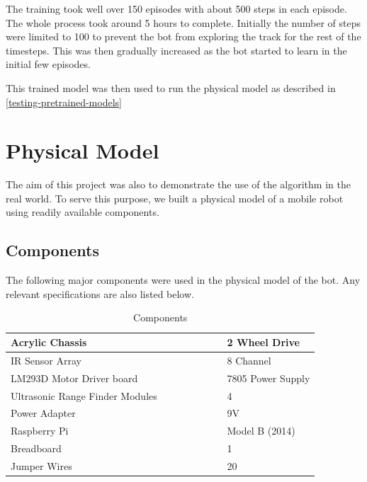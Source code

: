 \documentclass[12pt]{extreport}
\begin{document}
The training took well over 150 episodes with about 500 steps in each episode. The whole process took around 5 hours to complete. Initially the number of steps were limited to 100 to prevent the bot from exploring the track for the rest of the timesteps. This was then gradually increased as the bot started to learn in the initial few episodes.

This trained model was then used to run the physical model as described in \autoref{testing-pretrained-models}

\chapter{Physical Model}
The aim of this project was also to demonstrate the use of the algorithm in the real world. To serve this purpose, we built a physical model of a mobile robot using readily available components.

\section{Components}
The following major components were used in the physical model of the bot. Any relevant specifications are also listed below.

\begin{table}[h]
\centering
\begin{tabular}{|p{0.7\linewidth}|p{0.3\linewidth}|}
\hline
 Acrylic Chassis & 2 Wheel Drive \\ \hline
 IR Sensor Array & 8 Channel \\ \hline
 LM293D Motor Driver board & 7805 Power Supply \\ \hline
 Ultrasonic Range Finder Modules & 4 \\ \hline
 Power Adapter & 9V \\ \hline
 Raspberry Pi & Model B (2014)\\ \hline
 Breadboard & 1 \\ \hline
 Jumper Wires & 20 \\ \hline
\end{tabular}
\caption{Components}
\end{table}
\end{document}
